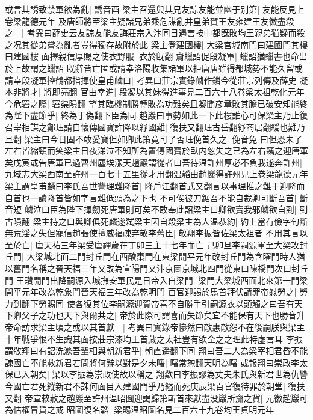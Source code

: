 或言其誘致禁軍欲為亂|{
	誘音酉}
梁主召還與其兄友諒友能並幽于别第|{
	友能反見上卷梁龍德元年}
及唐師將至梁主疑諸兄弟乘危謀亂并皇弟賀王友雍建王友徽盡殺之　|{
	考異曰薛史云友諒友能友誨莊宗入汴同日遇害按中都旣敗均王親弟猶疑而殺之况其從弟嘗為亂者豈得獨存故附於此}
梁主登建國樓|{
	大梁宫城南門曰建國門其樓曰建國樓}
面擇親信厚賜之使衣野服|{
	衣於旣翻}
齎蠟詔促段凝軍|{
	蠟詔猶蠟書也命出於上故謂之蠟詔}
旣辭皆亡匿或請幸洛陽收集諸軍以拒唐唐雖得都城勢不能久留或請幸段凝軍控鶴都指揮使皇甫麟曰|{
	考異曰莊宗實錄麟作鏻今從莊宗列傳及薛史}
凝本非將才|{
	將即亮翻}
官由幸進|{
	段凝以其妹得進事見二百六十八卷梁太祖乾化元年}
今危窘之際|{
	窘渠隕翻}
望其臨機制勝轉敗為功難矣且凝聞彦章敗其膽已破安知能終為陛下盡節乎|{
	終為于偽翻下臣為同}
趙巖曰事勢如此一下此樓誰心可保梁主乃止復召宰相謀之鄭珏請自懷傳國寶詐降以紓國難|{
	復扶又翻珏古岳翻紓商居翻緩也難乃旦翻}
梁主曰今日固不敢愛寶但如卿此策竟可了否珏俛首久之|{
	俛音免}
曰但恐未了左右皆縮頸而笑梁主日夜涕泣不知所為置傳國寶於臥内忽失之已為左右竊之迎唐軍矣戊寅或告唐軍已過曹州塵埃漲天趙巖謂從者曰吾待温許州厚必不負我遂奔許州|{
	九域志大梁西南至許州一百七十五里從才用翻温韜由趙巖得許州見上卷梁龍德元年}
梁主謂皇甫麟曰李氏吾世讐理難降首|{
	降戶江翻首式又翻言以事理推之難于迎降而自首也一讀降首皆如字言難低頭為之下也}
不可俟彼刀鋸吾不能自裁卿可斷吾首|{
	斷音短}
麟泣曰臣為陛下揮劒死唐軍則可矣不敢奉此詔梁主曰卿欲賣我邪麟欲自剄|{
	剄古隕翻}
梁主持之曰與卿俱死麟遂弑梁主因自殺梁主為人温恭約|{
	約上當有儉字句斷}
無荒淫之失但寵信趙張使擅威福疎弃敬李舊臣|{
	敬翔李振皆佐梁太祖者}
不用其言以至於亡|{
	唐天祐三年梁受唐禪歲在丁卯三主十七年而亡}
己卯旦李嗣源軍至大梁攻封丘門|{
	大梁城北面二門封丘門在西酸棗門在東梁開平元年改封丘門為含曜門時人猶以舊門名稱之晉天福三年又改為宣陽門又汴京圖京城北四門從東曰陳橋門次曰封丘門}
王瓚開門出降嗣源入城撫安軍民是日帝入自梁門|{
	梁門大梁城西面北來第一門梁開平元年改為乾象門晉天福三年改為乾明門}
百官迎謁於馬首拜伏請罪帝慰勞之|{
	勞力到翻下勞賜同}
使各復其位李嗣源迎賀帝喜不自勝手引嗣源衣以頭觸之曰吾有天下卿父子之功也天下與爾共之|{
	帝於此際可謂喜而失節矣宜不能保有天下也勝音升}
帝命訪求梁主頃之或以其首獻　|{
	考異曰實錄帝慘然曰敵惠敵怨不在後嗣朕與梁主十年戰爭恨不生識其面按莊宗漆均王首藏之太社豈有欲全之之理此特虚言耳}
李振謂敬翔曰有詔洗滌吾輩相與朝新君乎|{
	朝直遥翻下同}
翔曰吾二人為梁宰相君昏不能諫國亡不能救新君若問將何辭以對是夕未曙|{
	曙常恕翻天明為曙}
或報翔曰崇政李太保已入朝矣|{
	梁以李振為崇政使故以稱之}
翔歎曰李振謬為丈夫朱氏與新君世為仇讐今國亡君死縱新君不誅何面目入建國門乎乃縊而死庚辰梁百官復待罪於朝堂|{
	復扶又翻}
帝宣敕赦之趙巖至許州温昭圖迎謁歸第斬首來獻盡没巖所齎之貨|{
	元徽趙巖可為怙權冒貨之戒}
昭圖復名韜|{
	梁賜温昭圖名見二百六十九卷均王貞明元年}
